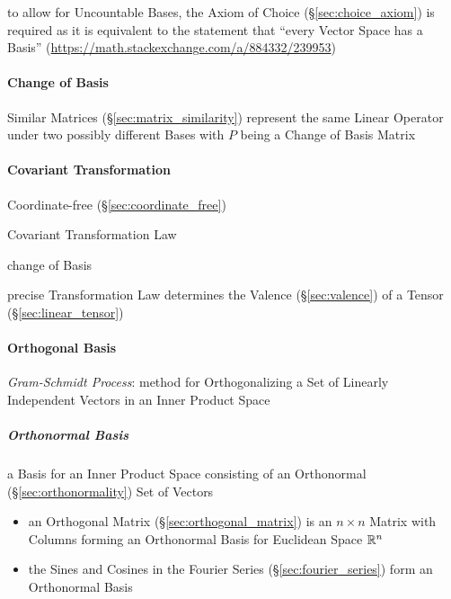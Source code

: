 to allow for Uncountable Bases, the Axiom of Choice
(\S\ref{sec:choice_axiom}) is required as it is equivalent to the statement
that ``every Vector Space has a Basis''
(\url{https://math.stackexchange.com/a/884332/239953})



\paragraph{Change of Basis}\label{sec:change_of_basis}\hfill

Similar Matrices (\S\ref{sec:matrix_similarity}) represent the same Linear
Operator under two possibly different Bases with $P$ being a Change of Basis
Matrix



\paragraph{Covariant Transformation}\label{sec:covariant_transformation}\hfill

Coordinate-free (\S\ref{sec:coordinate_free})

Covariant Transformation Law

change of Basis

precise Transformation Law determines the Valence
(\S\ref{sec:valence}) of a Tensor (\S\ref{sec:linear_tensor})



\paragraph{Orthogonal Basis}\label{sec:orthogonal_basis}\hfill

\emph{Gram-Schmidt Process}: method for Orthogonalizing a Set of Linearly
Independent Vectors in an Inner Product Space



\subparagraph{Orthonormal Basis}\label{sec:orthonormal_basis}\hfill

a Basis for an Inner Product Space consisting of an Orthonormal
(\S\ref{sec:orthonormality}) Set of Vectors

\begin{itemize}
  \item an Orthogonal Matrix (\S\ref{sec:orthogonal_matrix}) is an $n \times n$
    Matrix with Columns forming an Orthonormal Basis for Euclidean Space
    $\mathbb{R}^n$
  \item the Sines and Cosines in the Fourier Series
    (\S\ref{sec:fourier_series}) form an Orthonormal Basis
\end{itemize}



